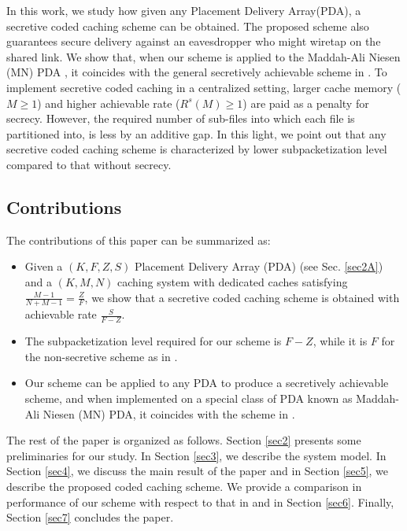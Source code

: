 \documentclass[conference]{IEEEtran}
\begin{document}
\par In this work, we study how given any Placement Delivery Array(PDA), a secretive coded caching scheme can be obtained. The proposed scheme also guarantees secure delivery against an eavesdropper who might wiretap on the shared link. We show that, when our scheme is applied to the Maddah-Ali Niesen (MN) PDA \cite{PDAmain}, it coincides with the general secretively achievable scheme in \cite{PrivateCc}. To implement secretive coded caching in a centralized setting, larger cache memory ($M\geq1$) and higher achievable rate ($R^{s}(M)\geq 1$) are paid as a penalty for secrecy. However, the required number of sub-files into which each file is partitioned into, is less by an additive gap. In this light, we point out that any secretive coded caching scheme is characterized by lower subpacketization level compared to that without secrecy.

\subsection{Contributions}\label{sec1B}
\par The contributions of this paper can be summarized as:
	\begin{itemize}
		\item  Given a $(K,F,Z,S)$ Placement Delivery Array (PDA) (see Sec. \ref{sec2A}) and a $(K,M,N)$ caching system with dedicated caches satisfying $\frac{M-1}{N+M-1}=\frac{Z}{F}$, we show that a secretive coded caching scheme is obtained with achievable rate $\frac{S}{F-Z}$.
		\item The subpacketization level required for our scheme is $F-Z$, while it is $F$ for the non-secretive scheme as in \cite{PDAmain}.
		\item Our scheme can be applied to any PDA to produce a secretively achievable scheme, and when implemented on a special class of PDA known as Maddah-Ali Niesen (MN) PDA, it coincides with the scheme in \cite{PrivateCc}. 
	\end{itemize}
\par The rest of the paper is organized as follows. Section \ref{sec2} presents some preliminaries for our study. In Section \ref{sec3}, we describe the system model. In Section \ref{sec4}, we discuss the main result of the paper and in Section \ref{sec5}, we describe the proposed coded caching scheme. We provide a comparison in performance of our scheme with respect to that in \cite{PrivateCc} and \cite{PDAmain} in Section \ref{sec6}. Finally, Section \ref{sec7} concludes the paper.
\end{document}
